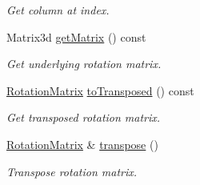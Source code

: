 \begin{DoxyCompactItemize}
\begin{DoxyCompactList}\small\item\em Get column at index. \end{DoxyCompactList}\item 
Matrix3d \hyperlink{classlibrary_1_1math_1_1geom_1_1trf_1_1rot_1_1_rotation_matrix_a34bb5fed2819a1b6f446ecc7ddf7ffd3}{get\+Matrix} () const
\begin{DoxyCompactList}\small\item\em Get underlying rotation matrix. \end{DoxyCompactList}\item 
\hyperlink{classlibrary_1_1math_1_1geom_1_1trf_1_1rot_1_1_rotation_matrix}{Rotation\+Matrix} \hyperlink{classlibrary_1_1math_1_1geom_1_1trf_1_1rot_1_1_rotation_matrix_aafb93f71d64ff383a58a9b9c4816a117}{to\+Transposed} () const
\begin{DoxyCompactList}\small\item\em Get transposed rotation matrix. \end{DoxyCompactList}\item 
\hyperlink{classlibrary_1_1math_1_1geom_1_1trf_1_1rot_1_1_rotation_matrix}{Rotation\+Matrix} \& \hyperlink{classlibrary_1_1math_1_1geom_1_1trf_1_1rot_1_1_rotation_matrix_ad289d307f62b26ab7e1340698388789a}{transpose} ()
\begin{DoxyCompactList}\small\item\em Transpose rotation matrix. \end{DoxyCompactList}\end{DoxyCompactItemize}
